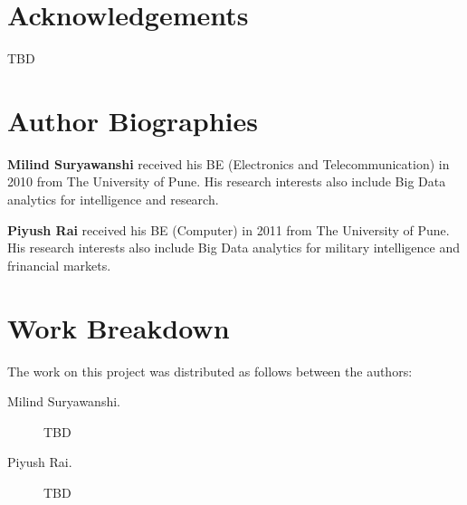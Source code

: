 \documentclass[9pt,twocolumn,twoside]{../../styles/osajnl}
\begin{document}
\section*{Acknowledgements}

TBD




 
\section*{Author Biographies}
\begingroup
\setlength\intextsep{0pt}
\begin{minipage}{1.0\columnwidth}
  \noindent
  {\bfseries Milind Suryawanshi} received his BE (Electronics and Telecommunication) in 2010 from
  The University of Pune. His research interests also include Big Data analytics for intelligence and research. 
\end{minipage}
\begin{minipage}{1.0\columnwidth} 
  \noindent
  {\bfseries Piyush Rai} received his BE (Computer) in 2011 from
  The University of Pune. His research interests also include Big Data analytics for military intelligence and frinancial markets. 
\end{minipage}

\endgroup

\newpage

\appendix

\section{Work Breakdown}

The work on this project was distributed as follows between the
authors:

\begin{description}

\item[Milind Suryawanshi.] TBD

\item[Piyush Rai.] TBD

\end{description}
\end{document}
